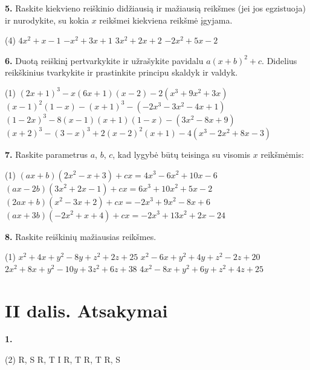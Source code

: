 \documentclass[11pt, a4paper]{article}
\begin{document}
\vspace{0.5cm}
\textbf{5.} Raskite kiekvieno reiškinio didžiausią ir mažiausią reikšmes (jei jos egzistuoja) ir nurodykite, su kokia $x$ reikšmei kiekviena reikšmė įgyjama.
\begin{tasks}(4)
    \task \(4x^2 + x - 1\)
    \task \(-x^2 + 3x + 1\)
    \task \(3x^2 + 2x + 2\)
    \task \(-2x^2 + 5x - 2\)
\end{tasks}

\vspace{0.5cm}
\newpage
\textbf{6.} Duotą reiškinį pertvarkykite ir užrašykite pavidalu \(a(x+b)^2+c\). Didelius reikškinius tvarkykite ir prastinkite principu skaldyk ir valdyk.
\begin{tasks}(1)
    \task \((2x+1)^3-x(6x+1)(x-2)-2\left(x^3+9x^2+3x\right)\)
    \task \((x-1)^2(1-x)-(x+1)^3-\left(-2x^3-3x^2-4x+1\right)\)
    \task \((1-2x)^3-8(x-1)(x+1)(1-x)-\left(3x^2-8x+9\right)\)
    \task \((x+2)^3-(3-x)^3+2(x-2)^2(x+1)-4\left(x^3-2x^2+8x-3\right)\)
\end{tasks}

\vspace{0.5cm}
\textbf{7.} Raskite parametrus \(a\), \(b\), \(c\), kad lygybė būtų teisinga su visomis \(x\) reikšmėmis:
\begin{tasks}(1)
    \task \((ax+b)(2x^2 - x + 3) + cx = 4x^3 - 6x^2 + 10x - 6\)
    \task \((ax-2b)(3x^2 + 2x - 1) + cx = 6x^3 + 10x^2 + 5x - 2\)
    \task \((2ax+b)(x^2 - 3x + 2) + cx = -2x^3 + 9x^2 - 8x + 6\)
    \task \((ax+3b)(-2x^2 + x + 4) + cx = -2x^3 + 13x^2 + 2x - 24\)
\end{tasks}

\vspace{0.5cm}
\textbf{8.} Raskite reiškinių mažiausias reikšmes.
\begin{tasks}(1)
    \task \(x^2 + 4x + y^2 - 8y + z^2 + 2z + 25\)
    \task \(x^2 - 6x + y^2 + 4y + z^2 - 2z + 20\)
    \task \(2x^2 + 8x + y^2 - 10y + 3z^2 + 6z + 38\)
    \task \(4x^2 - 8x + y^2 + 6y + z^2 + 4z + 25\)
\end{tasks}

\newpage

\section*{II dalis. Atsakymai}

\textbf{1.}
\begin{tasks}(2)
    \task R, S
    \task R, T
    \task I
    \task R, T
    \task R, T
    \task R, S
\end{tasks}
\end{document}

